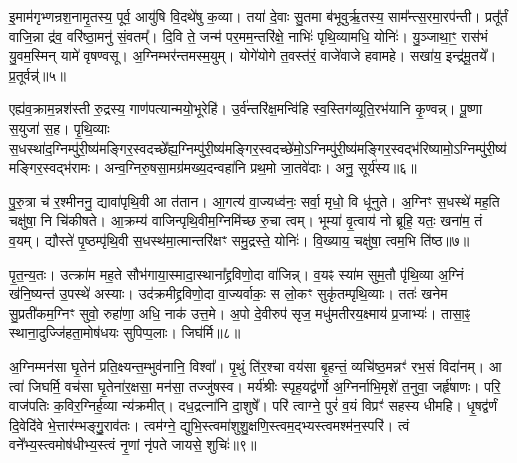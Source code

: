 {\anuvakamend[{इद्य॒ज्ञं प्र सु॑व॒ नारि॒रानु॑ष्टुभेन त्वा॒ छन्द॑सा॒ त्रीणि॑ च॥१॥}]}

इ॒माम॑गृभ्णन्रश॒नामृ॒तस्य॒ पूर्व॒ आयु॑षि वि॒दथे॑षु क॒व्या। तया॑ दे॒वाः सु॒तमा ब॑भूवुर्\mbox{}ऋ॒तस्य॒ साम᳚न्त्स॒रमा॒रप॑न्ती। प्रतू᳚र्तं वाजि॒न्ना द्र॑व॒ वरि॑ष्ठा॒मनु॑ सं॒वतम्᳚। दि॒वि ते॒ जन्म॑ पर॒मम॒न्तरि॑क्षे॒ नाभिः॑ पृथि॒व्यामधि॒ योनिः॑। यु॒ञ्जाथा॒ꣳ॒ रास॑भं यु॒वम॒स्मिन् यामे॑ वृषण्वसू। अ॒ग्निम्भर॑न्तमस्म॒युम्। योगे॑योगे त॒वस्त॑रं॒ वाजे॑वाजे हवामहे। सखा॑य॒ इन्द्र॑मू॒तये᳚। प्र॒तूर्वन्न्॑॥५॥

एह्य॑व॒क्राम॒न्नश॑स्ती रु॒द्रस्य॒ गाण॑पत्यान्मयो॒भूरेहि॑। उ॒र्व॑न्तरि॑क्ष॒मन्वि॑हि स्व॒स्तिग॑व्यूति॒रभ॑यानि कृ॒ण्वन्न्। पू॒ष्णा स॒युजा॑ स॒ह। पृ॒थि॒व्याः स॒धस्था॑द॒ग्निम्पु॑री॒ष्य॑मङ्गिर॒स्वदच्छे᳚ह्य॒ग्निम्पु॑री॒ष्य॑मङ्गिर॒स्वदच्छे॑मो॒\-ऽग्निम्पु॑री॒ष्य॑मङ्गिर॒\-स्वद्भ॑रिष्यामो॒\-ऽग्निम्पु॑री॒ष्य॑मङ्गिर॒स्वद्भ॑रामः। अन्व॒ग्निरु॒षसा॒मग्र॑मख्य॒दन्वहा॑नि प्रथ॒मो जा॒तवे॑दाः। अनु॒ सूर्य॑स्य॥६॥

पु॒रु॒त्रा च॑ र॒श्मीननु॒ द्यावा॑पृथि॒वी आ त॑तान। आ॒गत्य॑ वा॒ज्यध्व॑नः॒ सर्वा॒ मृधो॒ वि धू॑नुते। अ॒ग्निꣳ स॒धस्थे॑ मह॒ति चक्षु॑षा॒ नि चि॑कीषते। आ॒क्रम्य॑ वाजिन्पृथि॒वीम॒ग्निमि॑च्छ रु॒चा त्वम्। भूम्या॑ वृ॒त्वाय॑ नो ब्रूहि॒ यतः॒ खना॑म॒ तं व॒यम्। द्यौस्ते॑ पृ॒ष्ठम्पृ॑थि॒वी स॒धस्थ॑मा॒त्मान्तरि॑क्षꣳ समु॒द्रस्ते॒ योनिः॑। वि॒ख्याय॒ चक्षु॑षा॒ त्वम॒भि ति॑ष्ठ॥७॥

पृ॒त॒न्य॒तः। उत्क्रा॑म मह॒ते सौभ॑गाया॒स्मादा॒स्थाना᳚द्द्रविणो॒दा वा॑जिन्न्। व॒यꣴ स्या॑म सुम॒तौ पृ॑थि॒व्या अ॒ग्निं ख॑नि॒ष्यन्त॑ उ॒पस्थे॑ अस्याः। उद॑क्रमीद्द्रविणो॒दा वा॒ज्यर्वाकः॒ स लो॒कꣳ सुकृ॑तम्पृथि॒व्याः। ततः॑ खनेम सु॒प्रती॑कम॒ग्निꣳ सुवो॒ रुहा॑णा॒ अधि॒ नाक॑ उत्त॒मे। अ॒पो दे॒वीरुप॑ सृज॒ मधु॑मतीरय॒क्ष्माय॑ प्र॒जाभ्यः॑। तासा॒ꣴ॒ स्थाना॒दुज्जि॑हता॒मोष॑धयः सुपिप्प॒लाः। जिघ॑र्मि॥८॥

अ॒ग्निम्मन॑सा घृ॒तेन॑ प्रति॒क्ष्यन्त॒म्भुव॑नानि॒ विश्वा᳚। पृ॒थुं ति॑र॒श्चा वय॑सा बृ॒हन्तं॒ व्यचि॑ष्ठ॒मन्नꣳ॑ रभ॒सं विदा॑नम्। आ त्वा॑ जिघर्मि॒ वच॑सा घृ॒तेना॑र॒क्षसा॒ मन॑सा॒ तज्जु॑षस्व। मर्य॑श्रीः स्पृह॒यद्व॑र्णो अ॒ग्निर्नाभि॒मृशे॑ त॒नुवा॒ जर्\mbox{}हृ॑षाणः। परि॒ वाज॑पतिः क॒विर॒ग्निर्\mbox{}ह॒व्या न्य॑क्रमीत्। दध॒द्रत्ना॑नि दा॒शुषे᳚। परि॑ त्वाग्ने॒ पुरं॑ व॒यं विप्रꣳ॑ सहस्य धीमहि। धृ॒षद्व॑र्णं दि॒वेदि॑वे भे॒त्तार॑म्भङ्गु॒॒राव॑तः। त्वम॑ग्ने॒ द्युभि॒स्त्वमा॑शुशु॒क्षणि॒स्त्वम॒द्भ्यस्त्वमश्म॑न॒स्परि॑। त्वं वने᳚भ्य॒स्त्वमोष॑धीभ्य॒स्त्वं नृ॒णां नृ॑पते जायसे॒ शुचिः॑॥९॥

{\anuvakamend[{प्र॒तूर्व॒न्थ्सूर्य॑स्य तिष्ठ॒ जिघ॑र्मि भे॒त्तारं॑ विꣳश॒तिश्च॑॥२॥}]}

